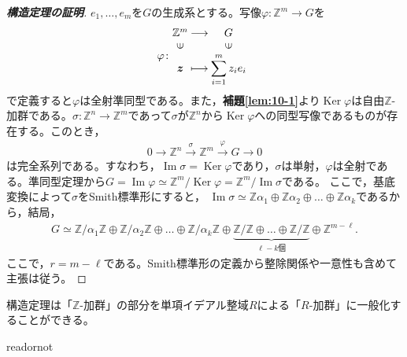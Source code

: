 \documentclass[uplatex]{jsarticle}
\DeclareMathOperator{\Image}{Im}
\DeclareMathOperator{\Kernel}{Ker}
\begin{document}
\begin{proof}[\textbf{構造定理の証明}]
  $e_{1}, \dots, e_{m}$を$G$の生成系とする。写像$\varphi \colon \mathbb{Z}^{m} \longrightarrow G$を
  \begin{align}
    \varphi \colon \mapdef{\mathbb{Z}^{m}}{G}{\bm{z}}{\displaystyle \sum_{i=1}^{m} z_{i} e_{i}}
  \end{align}
  で定義すると$\varphi$は全射準同型である。また，\textbf{補題\ref{lem:10-1}}より$\Kernel \varphi$は自由$\mathbb{Z}$-加群である。$\sigma \colon \mathbb{Z}^{n} \longrightarrow \mathbb{Z}^{m}$であって$\sigma$が$\mathbb{Z}^{n}$から$\Kernel \varphi$への同型写像であるものが存在する。このとき，
  \begin{align}
    0 \longrightarrow \mathbb{Z}^{n} \stackrel{\sigma}{\longrightarrow} \mathbb{Z}^{m} \stackrel{\varphi}{\longrightarrow} G \longrightarrow 0
  \end{align}
  は完全系列である。すなわち，$\Image \sigma = \Kernel \varphi$であり，$\sigma$は単射，$\varphi$は全射である。準同型定理から$G = \Image \varphi \simeq \mathbb{Z}^{m} / \Kernel \varphi = \mathbb{Z}^{m} / \Image \sigma$である。
  ここで，基底変換によって$\sigma$をSmith標準形にすると，
  $\Image \sigma \simeq \mathbb{Z} \alpha_{1} \oplus \mathbb{Z} \alpha_{2} \oplus \dots \oplus \mathbb{Z} \alpha_{k}$であるから，結局，
  \begin{align}
    G \simeq \mathbb{Z}/\alpha_{1}\mathbb{Z} \oplus \mathbb{Z}/\alpha_{2}\mathbb{Z} \oplus \dots \oplus \mathbb{Z}/\alpha_{k}\mathbb{Z} \oplus \underbrace{\mathbb{Z}/\mathbb{Z} \oplus \dots \oplus \mathbb{Z}/\mathbb{Z}}_{\ell -k\text{個}} \oplus \mathbb{Z}^{m - \ell}.
  \end{align}
  ここで，$r = m -\ell$である。Smith標準形の定義から整除関係や一意性も含めて主張は従う。
\end{proof}

 構造定理は「$\mathbb{Z}$-加群」の部分を単項イデアル整域$R$による「$R$-加群」に一般化することができる。

\expandafter\ifx\csname readornot\endcsname\relax
  
\end{document}

